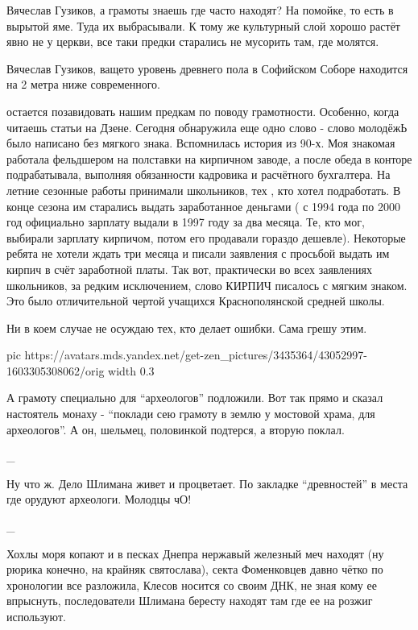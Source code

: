 \begin{itemize}

Вячеслав Гузиков, а грамоты знаешь где часто находят? На помойке, то есть в
вырытой яме. Туда их выбрасывали. К тому же культурный слой хорошо растёт явно
не у церкви, все таки предки старались не мусорить там, где молятся.


Вячеслав Гузиков, ващето уровень древнего пола в Софийском Соборе находится на
2 метра ниже современного.


остается позавидовать нашим предкам по поводу грамотности. Особенно, когда
читаешь статьи на Дзене. Сегодня обнаружила еще одно слово - слово молодёжЬ
было написано без мягкого знака. Вспомнилась история из 90-х. Моя знакомая
работала фельдшером на полставки на кирпичном заводе, а после обеда в конторе
подрабатывала, выполняя обязанности кадровика и расчётного бухгалтера. На
летние сезонные работы принимали школьников, тех , кто хотел подработать. В
конце сезона им старались выдать заработанное деньгами ( с 1994 года по 2000
год официально зарплату выдали в 1997 году за два месяца. Те, кто мог, выбирали
зарплату кирпичом, потом его продавали гораздо дешевле). Некоторые ребята не
хотели ждать три месяца и писали заявления с просьбой выдать им кирпич в счёт
заработной платы. Так вот, практически во всех заявлениях школьников, за редким
исключением, слово КИРПИЧ писалось с мягким знаком. Это было отличительной
чертой учащихся Краснополянской средней школы.

Ни в коем случае не осуждаю тех, кто делает ошибки. Сама грешу этим.


\ifcmt
pic https://avatars.mds.yandex.net/get-zen_pictures/3435364/43052997-1603305308062/orig
width 0.3
\fi


А грамоту специально для \enquote{археологов} подложили. Вот так прямо и сказал
настоятель монаху - \enquote{поклади сею грамоту в землю у мостовой храма, для
археологов}. А он, шельмец, половинкой подтерся, а вторую поклал.

_

Ну что ж. Дело Шлимана живет и процветает. По закладке \enquote{древностей} в места
где орудуют археологи. Молодцы чО!

_

Хохлы моря копают и в песках Днепра нержавый железный меч находят (ну рюрика
конечно, на крайняк святослава), секта Фоменковцев давно чётко по хронологии
все разложила, Клесов носится со своим ДНК, не зная кому ее впрыснуть,
последователи Шлимана бересту находят там где ее на розжиг используют.


\end{itemize}
